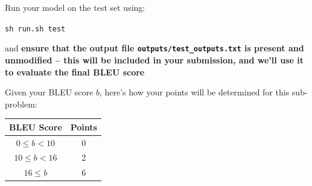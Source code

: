 \begin{enumerate}[(a)]
    Run your model on the test set using:
        \begin{center}
            \texttt{sh run.sh test}
        \end{center}
    and \textbf{ensure that the output file \texttt{outputs/test\_outputs.txt} is present and unmodified -- this will be included in your submission, and we'll use it to evaluate the final BLEU score}
    
    Given your BLEU score $b$, here's how your points will be determined for this sub-problem: \newline \\
    \begin{tabular}{c c}
        BLEU Score & Points \\ \hline 
        $0 \le b < 10 $ & 0 \\ %
        $10 \le b < 16$ & 2 \\ %
        $16 \le b$ & 6 \\ %
    \end{tabular}

\end{enumerate}